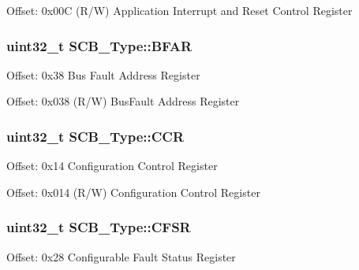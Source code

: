 Offset\-: 0x00\-C (R/\-W) Application Interrupt and Reset Control Register \hypertarget{struct_s_c_b___type_a31f79afe86c949c9862e7d5fce077c3a}{
\subsubsection[{B\-F\-A\-R}]{ uint32\-\_\-t S\-C\-B\-\_\-\-Type\-::\-B\-F\-A\-R}}\label{struct_s_c_b___type_a31f79afe86c949c9862e7d5fce077c3a}
Offset\-: 0x38 Bus Fault Address Register

Offset\-: 0x038 (R/\-W) Bus\-Fault Address Register \hypertarget{struct_s_c_b___type_a6d273c6b90bad15c91dfbbad0f6e92d8}{
\subsubsection[{C\-C\-R}]{ uint32\-\_\-t S\-C\-B\-\_\-\-Type\-::\-C\-C\-R}}\label{struct_s_c_b___type_a6d273c6b90bad15c91dfbbad0f6e92d8}
Offset\-: 0x14 Configuration Control Register

Offset\-: 0x014 (R/\-W) Configuration Control Register \hypertarget{struct_s_c_b___type_a2f94bf549b16fdeb172352e22309e3c4}{
\subsubsection[{C\-F\-S\-R}]{ uint32\-\_\-t S\-C\-B\-\_\-\-Type\-::\-C\-F\-S\-R}}\label{struct_s_c_b___type_a2f94bf549b16fdeb172352e22309e3c4}
Offset\-: 0x28 Configurable Fault Status Register

